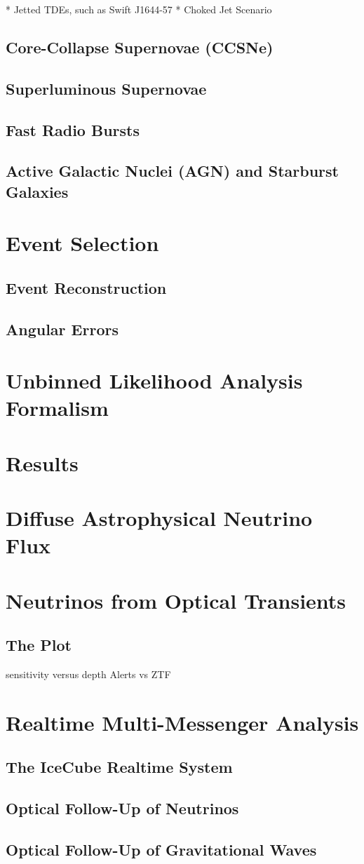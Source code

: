 \documentclass[]{article}
\begin{document}
* Jetted TDEs, such as Swift J1644-57
* Choked Jet Scenario

\subsection{Core-Collapse Supernovae (CCSNe)}

\subsection{Superluminous Supernovae}

\subsection{Fast Radio Bursts}

\subsection{Active Galactic Nuclei (AGN) and Starburst Galaxies}

\section{Event Selection}

\subsection{Event Reconstruction}
\subsection{Angular Errors}
\section{Unbinned Likelihood Analysis Formalism}

\section{Results}
\section{Diffuse Astrophysical Neutrino Flux}

\section{Neutrinos from Optical Transients}
\subsection{The Plot}
sensitivity versus depth
Alerts vs ZTF

\section{Realtime Multi-Messenger Analysis}
\subsection{The IceCube Realtime System}
\subsection{Optical Follow-Up of Neutrinos}

\subsection{Optical Follow-Up of Gravitational Waves}
\end{document}
